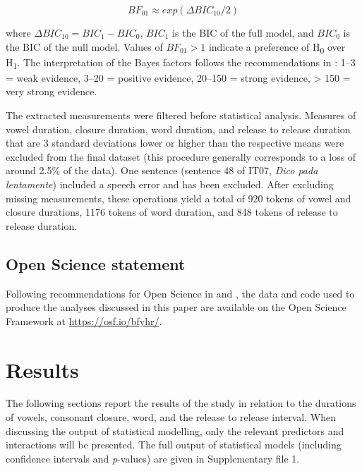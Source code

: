 \documentclass[charis]{glossa}
\begin{document}
\begin{equation}
\label{eq:bayes}
BF_{01} \approx exp(\Delta{}BIC_{10}/2)
\end{equation}

where \(\Delta{}BIC_{10} = BIC_1 - BIC_0\), \(BIC_1\) is the BIC of the
full model, and \(BIC_0\) is the BIC of the null model. Values of
\(BF_{01} > 1\) indicate a preference of H\textsubscript{0} over
H\textsubscript{1}. The interpretation of the Bayes factors follows the
recommendations in \citet[p.~139]{raftery1995}: 1--3 = weak evidence,
3--20 = positive evidence, 20--150 = strong evidence, \textgreater{} 150
= very strong evidence.

The extracted measurements were filtered before statistical analysis.
Measures of vowel duration, closure duration, word duration, and release
to release duration that are 3 standard deviations lower or higher than
the respective means were excluded from the final dataset (this
procedure generally corresponds to a loss of around 2.5\% of the data).
One sentence (sentence 48 of IT07, \emph{Dico pada lentamente}) included
a speech error and has been excluded. After excluding missing
measurements, these operations yield a total of 920 tokens of vowel and
closure durations, 1176 tokens of word duration, and 848 tokens of
release to release duration.

\hypertarget{open-science-statement}{%
\subsection{Open Science statement}\label{open-science-statement}}

Following recommendations for Open Science in \citet{cruwell2018} and
\citet{berez-kroeker2018}, the data and code used to produce the
analyses discussed in this paper are available on the Open Science
Framework at \url{https://osf.io/bfyhr/}.

\hypertarget{results}{%
\section{Results}\label{results}}

The following sections report the results of the study in relation to
the durations of vowels, consonant closure, word, and the release to
release interval. When discussing the output of statistical modelling,
only the relevant predictors and interactions will be presented. The
full output of statistical models (including confidence intervals and
\emph{p}-values) are given in Supplementary file 1.
\end{document}
